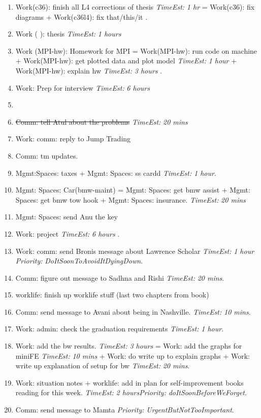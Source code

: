 \documentclass[11pt]{article}
\newcommand{\doneTask}[1]{\item \sout{\small #1}}
\newcommand{\te}[1]{\textit{TimeEst:} \textit{#1}}
\newcommand{\priority}[1]{\textit{Priority:} \textit{#1}}
\newcommand{\prio}[1]{\textit{Priority:} \textit{#1}}
\begin{document}
\begin{enumerate}
\item Work(c36): finish all L4 corrections of thesis \te{1 hr} =
  Work(c36): fix diagrams   + Work(c36l4): fix that/this/it . 
\item Work (   ): thesis \te{1 hours} 


\item Work (MPI-hw): Homework for MPI  =  Work(MPI-hw): run code on
  machine  + Work(MPI-hw): get plotted data and plot model  \te{1 hour}  +
  Work(MPI-hw): explain hw  \te{3 hours} . 

\item Work:  Prep for interview   \te{6 hours} 


\item \doneTask{Comm: tell Atul about the problems} \te{20 mins}

\item Work: comm: reply to Jump Trading 
\item Comm: tm updates. 
\item Mgmt:Spaces: taxes  + Mgmt: Spaces: ss cardd  \te {1 hour}. 
\item Mgmt: Spaces: Car(bmw-maint)  =  Mgmt: Spaces: get bmw assist +
  Mgmt: Spaces: get bmw tow hook  + Mgmt: Spaces: insurance. \te{20
    mins} 
\item Mgmt: Spaces: send Anu the key 

\item Work: project \te {6 hours} . 


\item Work: comm: send Bronis message about Lawrence Scholar \te{1 hour} \prio{DoItSoonToAvoidItDyingDown}. 

\item Comm: figure out message to Sadhna and Rishi \te{20 mins}. 
\item worklife: finish up worklife stuff (last two chapters from book)



\item Comm: send message to Avani about being in Nashville. \te{10 mins}. 

\item Work: admin: check the graduation requirements \te{1 hour}.

\item Work: add the bw results. \te{3 hours}  =  Work: add the graphs
  for miniFE \te{10 mins}   +  Work: do write up to explain graphs +
  Work: write up explanation of setup for bw  \te{20 mins}. 

\item Work: situation notes + worklife: add in plan for
  self-improvement books reading for this week.  \te{2
    hours}\prio{doItSoonBeforeWeForget}. 
\item Comm: send message to Mamta  \priority{UrgentButNotTooImportant}. 


\end{enumerate}
 
\end{document}
